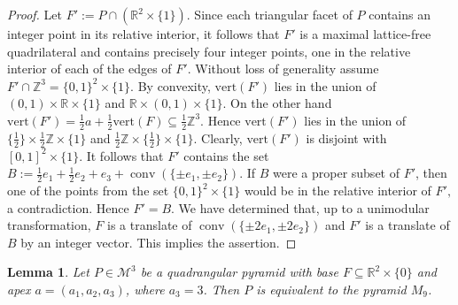 \documentclass[a4paper]{article}
\theoremstyle{plain}
\newtheorem{lemma}[nn]{Lemma}
\begin{document}
\begin{proof}
Let $F':= P \cap ({\mathbb{R}}^2 \times \{1\})$.
Since each triangular facet of $P$ contains an integer point
in its relative interior, it follows that $F'$ is a maximal
lattice-free quadrilateral and contains precisely four
integer points, one in the relative interior of each of the
edges of $F'$.
Without loss of generality assume $F'\cap {\mathbb{Z}}^3 = \{0,1\}^2
\times \{1\}$.
By convexity, ${\mathrm{vert}}(F')$ lies in the union of $(0,1)
\times {\mathbb{R}} \times \{1\}$ and ${\mathbb{R}} \times (0,1) \times \{1\}$.
On the other hand ${\mathrm{vert}}(F') = \frac{1}{2} a + \frac{1}{2}
{\mathrm{vert}}(F) \subseteq \frac{1}{2} {\mathbb{Z}}^3$.
Hence ${\mathrm{vert}}(F')$ lies in the union of $\{\frac{1}{2}\}
\times \frac{1}{2} {\mathbb{Z}} \times \{1\}$ and $\frac{1}{2} {\mathbb{Z}}
\times \{\frac{1}{2}\} \times \{1\}$.
Clearly, ${\mathrm{vert}}(F')$ is disjoint with $[0,1]^2 \times
\{1\}$.
It follows that $F'$ contains the set $B := \frac{1}{2} e_1
+ \frac{1}{2} e_2 + e_3 + {{\mathop{\mathrm{{conv}}}}}(\{\pm e_1, \pm e_2\})$.
If $B$ were a proper subset of $F'$, then one of the points
from the set $\{0,1\}^2 \times \{1\}$ would be in the
relative interior of $F',$ a contradiction.
Hence $F'=B$.
We have determined that, up to a unimodular transformation,
$F$ is a translate of ${{\mathop{\mathrm{{conv}}}}}(\{\pm 2 e_1, \pm 2 e_2\})$ and
$F'$ is a translate of $B$ by an integer vector.
This implies the assertion.
\end{proof}

\begin{lemma}
Let $P \in {\mathcal{M}^3}$ be a quadrangular pyramid with base $F
\subseteq {\mathbb{R}}^2 \times \{0\}$ and apex $a = (a_1, a_2, a_3)$,
where $a_3 = 3$.
Then $P$ is equivalent to the pyramid $M_9$.
\end{lemma}
\end{document}
